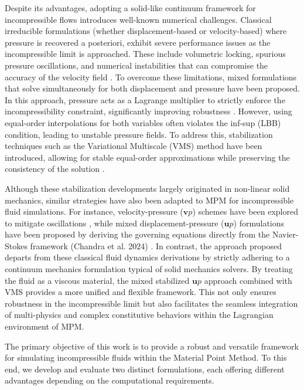 \documentclass[11pt,english]{article}
\def\up{$\boldsymbol{u}p$\xspace}
\def\vp{$\boldsymbol{v}p$\xspace}
\begin{document}
    

    Despite its advantages, adopting a solid-like continuum framework for incompressible flows introduces well-known numerical challenges. Classical irreducible formulations (whether displacement-based or velocity-based) where pressure is recovered a posteriori, exhibit severe performance issues as the incompressible limit is approached. These include volumetric locking, spurious pressure oscillations, and numerical instabilities that can compromise the accuracy of the velocity field \cite{belytschko2000nonlinear, zienkiewicz2005finite}. To overcome these limitations, mixed formulations that solve simultaneously for both displacement and pressure have been proposed. In this approach, pressure acts as a Lagrange multiplier to strictly enforce the incompressibility constraint, significantly improving robustness \cite{franca1988new,hughes1987new,maniatty2001stabilized}. However, using equal-order interpolations for both variables often violates the inf-sup (LBB) condition, leading to unstable pressure fields. To address this, stabilization techniques such as the Variational Multiscale (VMS) method have been introduced, allowing for stable equal-order approximations while preserving the consistency of the solution \cite{masud2013framework, codina2000stabilization}.


    Although these stabilization developments largely originated in non-linear solid mechanics, similar strategies have also been adapted to MPM for incompressible fluid simulations. For instance, velocity-pressure (\vp) schemes have been explored to mitigate oscillations \cite{mast2012mitigating, li2014sloshing}, while mixed displacement-pressure (\up) formulations have been proposed by deriving the governing equations directly from the Navier-Stokes framework (Chandra et al. 2024) \cite{chandra2024stabilized}. In contrast, the approach proposed departs from these classical fluid dynamics derivations by strictly adhering to a continuum mechanics formulation typical of solid mechanics solvers. By treating the fluid as a viscous material, the mixed stabilized \up approach combined with VMS provides a more unified and flexible framework. This not only ensures robustness in the incompressible limit but also facilitates the seamless integration of multi-physics and complex constitutive behaviors within the Lagrangian environment of MPM.

    The primary objective of this work is to provide a robust and versatile framework for simulating incompressible fluids within the Material Point Method. To this end, we develop and evaluate two distinct formulations, each offering different advantages depending on the computational requirements.
\end{document}
